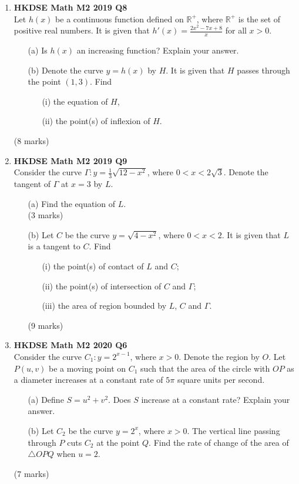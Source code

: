 \documentclass{report}
\begin{document}
\begin{enumerate}
	\item \textbf{HKDSE Math M2 2019 Q8}\\
	Let $h(x)$ be a continuous function defined on $\mathbb{R}^+$, where $\mathbb{R}^+$ is the set of positive real numbers. It is given that $\displaystyle h'(x) = \frac{2x^2 -7x+8}{x}$ for all $x > 0$. 
	\begin{enumerate}
		\item [(a)] Is $h(x)$ an increasing function? Explain your answer. 
		\item [(b)] Denote the curve $y = h(x)$ by $H$. It is given that $H$ passes through the point $(1,3)$. Find  
		\begin{enumerate}
			\item [(i)]the equation of $H$,
			\item [(ii)]the point(s) of inflexion of $H$.
		\end{enumerate} 
	\end{enumerate}
	(8 marks)

	\item \textbf{HKDSE Math M2 2019 Q9}\\
	Consider the curve $\Gamma : y = \displaystyle\frac{1}{3}\sqrt{12-x^2}$, where $0<x<2\sqrt{3}$. Denote the tangent of $\Gamma$ at $x = 3$ by $L$.  
	\begin{enumerate}
		\item [(a)]Find the equation of $L$. \\(3 marks)
		\item [(b)]Let $C$ be the curve $y = \sqrt{4-x^2}$, where $0<x<2$. It is given that $L$ is a tangent to $C$. Find 
		\begin{enumerate}
			\item [(i)]the point(s) of contact of $L$ and $C$;  
			\item [(ii)]the point(s) of intersection of $C$ and $\Gamma$;  
			\item [(iii)]the area of region bounded by $L$, $C$ and $\Gamma$.
		\end{enumerate}
		(9 marks)
	\end{enumerate}

	\item \textbf{HKDSE Math M2 2020 Q6}\\
	Consider the curve $C_1 : y = 2^{x-1}$, where $x>0$. Denote the region by $O$. Let $P(u,v)$ be a moving point on $C_1$ such that the area of the circle with $OP$ as a diameter increases at a constant rate of $5\pi$ square units per second.
	\begin{enumerate}
		\item[(a)]
		Define $S = u^2 + v^2$. Does $S$ increase at a constant rate? Explain your answer. 
		\item[(b)]
		Let $C_2$ be the curve $y = 2^x$, where $x>0$. The vertical line passing through $P$ cuts $C_2$ at the point $Q$. Find the rate of change of the area of $\triangle OPQ$ when $u=2$.
	\end{enumerate}
	(7 marks)


\end{enumerate}
\end{document}
